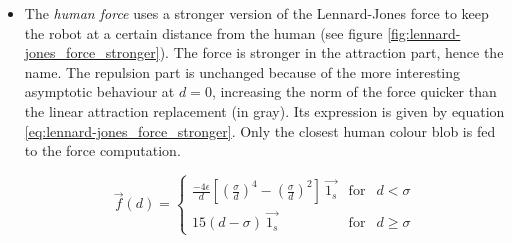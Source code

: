 \documentclass[oneside, a4paper, 12pt]{memoir}
\begin{document}
			\begin{itemize}
				\item The \emph{human force} uses a stronger version of the Lennard-Jones force to keep the robot at a certain distance from the human (see figure \ref{fig:lennard-jones_force_stronger}). The force is stronger in the attraction part, hence the name. The repulsion part is unchanged because of the more interesting asymptotic behaviour at $d=0$, increasing the norm of the force quicker than the linear attraction replacement (in gray). Its expression is given by equation \ref{eq:lennard-jones_force_stronger}. Only the closest human colour blob is fed to the force computation.
				
					\begin{equation}
						\vec{f}(d) = \left\{ \begin{array}{rcl}
						\frac{-4\epsilon}{d} \left[ \left(\frac{\sigma}{d}\right)^{4} - \left(\frac{\sigma}{d}\right)^2 \right] ~\vec{1_s} & \mbox{for} & d < \sigma \\
						15(d - \sigma ) ~\vec{1_s} & \mbox{for} & d \geq \sigma
						\end{array}\right.
						\label{eq:lennard-jones_force_stronger}
					\end{equation}
				
					\begin{figure}\centering
						

\end{figure}
\end{itemize}
\end{document}
